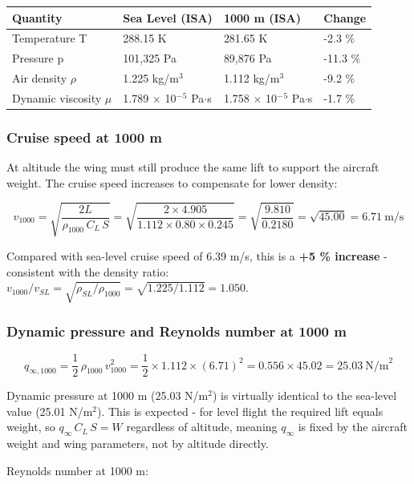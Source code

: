 \documentclass[10pt,a4paper]{article}
\begin{document}
\begin{center}
\begin{tabular}{|l|l|l|l|}
\hline
Quantity & Sea Level (ISA) & 1000 m (ISA) & Change \\
\hline
Temperature T & 288.15 K & 281.65 K & -2.3 \% \\
\hline
Pressure p & 101,325 Pa & 89,876 Pa & -11.3 \% \\
\hline
Air density ${\rho}$ & 1.225 kg/m$^{3}$ & 1.112 kg/m$^{3}$ & -9.2 \% \\
\hline
Dynamic viscosity ${\mu}$ & 1.789 ${\times}$ 10$^{-}$$^{5}$ Pa${\cdot}$s & 1.758 ${\times}$ 10$^{-}$$^{5}$ Pa${\cdot}$s & -1.7 \% \\
\hline
\end{tabular}
\end{center}


\subsubsection{Cruise speed at 1000 m}


At altitude the wing must still produce the same lift to support the aircraft weight. The cruise speed increases to compensate for lower density:

\[
v_{1000} = \sqrt{\frac{2L}{\rho_{1000}\,C_L\,S}} = \sqrt{\frac{2 \times 4.905}{1.112 \times 0.80 \times 0.245}} = \sqrt{\frac{9.810}{0.2180}} = \sqrt{45.00} = 6.71\ \text{m/s}
\]

Compared with sea-level cruise speed of 6.39 m/s, this is a \textbf{+5 \% increase} - consistent with the density ratio: $v_{1000}/v_{SL} = \sqrt{\rho_{SL}/\rho_{1000}} = \sqrt{1.225/1.112} = 1.050$.


\subsubsection{Dynamic pressure and Reynolds number at 1000 m}


\[
q_{\infty,1000} = \frac{1}{2}\,\rho_{1000}\,v_{1000}^2 = \frac{1}{2} \times 1.112 \times (6.71)^2 = 0.556 \times 45.02 = 25.03\ \text{N/m}^2
\]

Dynamic pressure at 1000 m (25.03 N/m$^{2}$) is virtually identical to the sea-level value (25.01 N/m$^{2}$). This is expected - for level flight the required lift equals weight, so $q_\infty\,C_L\,S = W$ regardless of altitude, meaning $q_\infty$ is fixed by the aircraft weight and wing parameters, not by altitude directly.

Reynolds number at 1000 m:
\end{document}
